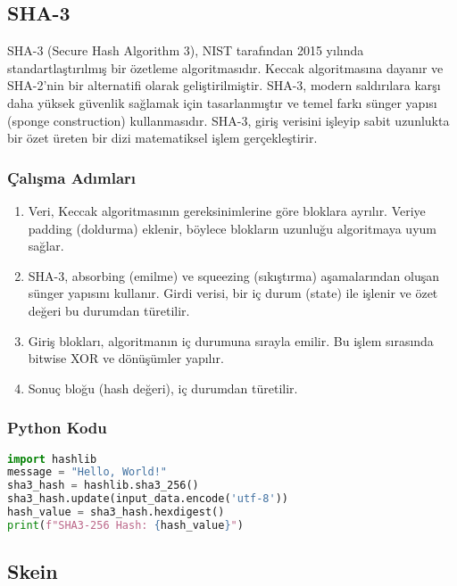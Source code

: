 \newpage

\subsection{SHA-3}

SHA-3 (Secure Hash Algorithm 3), NIST tarafından 2015 yılında standartlaştırılmış bir özetleme algoritmasıdır. Keccak algoritmasına dayanır ve SHA-2'nin bir alternatifi olarak geliştirilmiştir. SHA-3, modern saldırılara karşı daha yüksek güvenlik sağlamak için tasarlanmıştır ve temel farkı sünger yapısı (sponge construction) kullanmasıdır. SHA-3, giriş verisini işleyip sabit uzunlukta bir özet üreten bir dizi matematiksel işlem gerçekleştirir. 

\subsubsection{Çalışma Adımları}

\begin{enumerate}
    \item Veri, Keccak algoritmasının gereksinimlerine göre bloklara ayrılır. Veriye padding (doldurma) eklenir, böylece blokların uzunluğu algoritmaya uyum sağlar.
    \item SHA-3, absorbing (emilme) ve squeezing (sıkıştırma) aşamalarından oluşan sünger yapısını kullanır. Girdi verisi, bir iç durum (state) ile işlenir ve özet değeri bu durumdan türetilir.
    \item Giriş blokları, algoritmanın iç durumuna sırayla emilir. Bu işlem sırasında bitwise XOR ve dönüşümler yapılır.
    \item Sonuç bloğu (hash değeri), iç durumdan türetilir.
\end{enumerate}

\subsubsection{Python Kodu}

\begin{lstlisting}[language=Python]
import hashlib
message = "Hello, World!"
sha3_hash = hashlib.sha3_256()
sha3_hash.update(input_data.encode('utf-8')) 
hash_value = sha3_hash.hexdigest()
print(f"SHA3-256 Hash: {hash_value}")
\end{lstlisting}

\newpage

\subsection{Skein}

